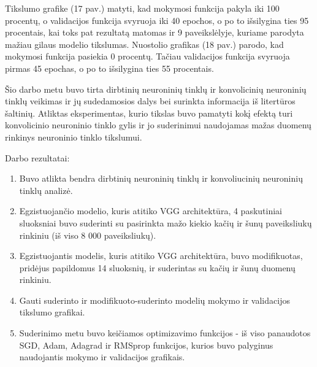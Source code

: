 \documentclass{VUMIFPSkursinis}
\begin{document}
Tikslumo grafike (17 pav.) matyti, kad mokymosi funkcija pakyla iki 100 procentų, o validacijos funkcija svyruoja iki 40 epochos, o po to išsilygina ties 95 procentais, kai toks pat rezultatą matomas ir 9 paveikslėlyje, kuriame parodyta mažiau gilaus modelio tikslumas.
Nuostolio grafikas (18 pav.) parodo, kad mokymosi funkcija pasiekia 0 procentų. Tačiau validacijos funkcija svyruoja pirmas 45 epochas, o po to išsilygina ties 55 procentais.

Šio darbo metu buvo tirta dirbtinių neuroninių tinklų ir konvolicinių neuroninių tinklų veikimas ir jų sudedamosios dalys bei surinkta informacija iš litertūros šaltinių. Atliktas eksperimentas, kurio tikslas buvo pamatyti kokį efektą turi konvolicinio neuroninio tinklo gylis ir jo suderinimui naudojamas mažas duomenų rinkinys neuroninio tinklo tikslumui.

\hfill\break

Darbo rezultatai:
\begin{enumerate}
\item Buvo atlikta bendra dirbtinių neuroninių tinklų ir konvoliucinių neuroninių tinklų analizė.
\item Egzistuojančio modelio, kuris atitiko VGG architektūra, 4 paskutiniai sluoksniai buvo suderinti su pasirinkta mažo kiekio kačių ir šunų paveiksliukų rinkiniu (iš viso 8 000 paveiksliukų).
\item Egzistuojantis modelis, kuris atitiko VGG architektūra, buvo modifikuotas, pridėjus papildomus 14 sluoksnių, ir suderintas su kačių ir šunų duomenų rinkiniu.
\item Gauti suderinto ir modifikuoto-suderinto modelių mokymo ir validacijos tikslumo grafikai.
\item Suderinimo metu buvo keičiamos optimizavimo funkcijos - iš viso panaudotos SGD, Adam, Adagrad ir RMSprop funkcijos, kurios buvo palyginus naudojantis mokymo ir validacijos grafikais.
\end{enumerate}

\hfill\break
\end{document}
